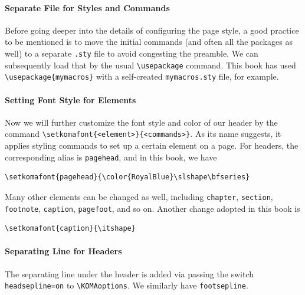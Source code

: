 \paragraph{Separate File for Styles and Commands}
Before going deeper into the details of configuring the page style, a good practice to be mentioned is to move the initial commands (and often all the packages as well) to a separate \texttt{.sty} file to avoid congesting the preamble. We can subsequently load that by the usual \texttt{\textbackslash usepackage} command. This book has used \texttt{\textbackslash usepackage\{mymacros\}} with a self-created \texttt{mymacros.sty} file, for example.

\paragraph{Setting Font Style for Elements}
Now we will further customize the font style and color of our header by the command \texttt{\textbackslash setkomafont\{<element>\}\allowbreak\{<commands>\}}. As its name suggests, it applies styling commands to set up a certain element on a page. For headers, the corresponding alias is \texttt{pagehead}, and in this book, we have
\begin{lstlisting}
\setkomafont{pagehead}{\color{RoyalBlue}\slshape\bfseries}    
\end{lstlisting}
Many other elements can be changed as well, including \texttt{chapter}, \texttt{section}, \texttt{footnote}, \texttt{caption}, \texttt{pagefoot}, and so on. Another change adopted in this book is
\begin{lstlisting}
\setkomafont{caption}{\itshape}    
\end{lstlisting}

\paragraph{Separating Line for Headers}
The separating line under the header is added via passing the switch \texttt{headsepline=on} to \texttt{\textbackslash KOMAoptions}. We similarly have \texttt{footsepline}.

